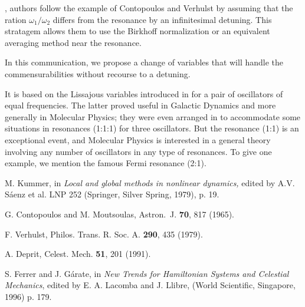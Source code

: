 \cite{Dep91}, authors follow the example of Contopoulos
\cite{ContMout} and Verhulst \cite{Verhulst} by assuming that the
ration $\omega_1/\omega_2$ differs from the resonance by an
infinitesimal detuning. This stratagem allows them to use the Birkhoff
normalization or an equivalent averaging method near the resonance.
\par In this communication, we propose a change of variables that will
handle the commensurabilities without recourse to a detuning.
\par It is based on the Lissajous variables introduced in \cite{Dep91}
for a pair of oscillators of equal frequencies. The latter proved
useful in Galactic Dynamics  and more
generally in Molecular Physics; they were
even arranged in \cite{Ferrer} to accommodate some situations in
resonances (1:1:1) for three oscillators. But the resonance (1:1) is
an exceptional event, and Molecular Physics is interested in a general
theory involving any number of oscillators in any type of resonances.
To give one example, we mention the famous Fermi resonance (2:1).

\begin{thebibliography}{}

M. Kummer, in {\sl Local and global methods in nonlinear dynamics,} edited
by A.V. S\'aenz et
al. LNP 252 (Springer, Silver Spring, 1979), p. 19.

	G. Contopoulos and M. Moutsoulas,
	Astron.~J.  {\bf 70}, 817  (1965).

F. Verhulst, Philos. Trans. R. Soc. A. {\bf 290}, 435 (1979).

  A. Deprit, Celest. Mech. {\bf 51}, 201 (1991).


S. Ferrer and J. G\'arate, in  {\sl New Trends for Hamiltonian Systems and
Celestial
Mechanics}, edited by E. A. Lacomba and J. Llibre, (World Scientific,
Singapore, 1996) p.
179.

\end{thebibliography}




